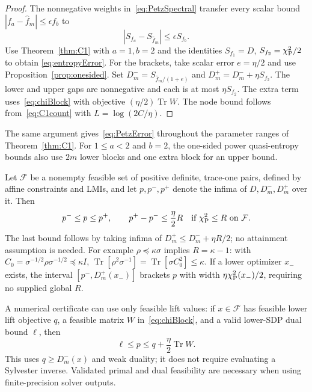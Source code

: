 \documentclass[11pt]{article}
\numberwithin{equation}{section}
\newcommand{\tr}{\operatorname{Tr}}
\begin{document}
\begin{proof}
The nonnegative weights in~\eqref{eq:PetzSpectral} transfer every scalar
bound $|f_a-\widehat f_m|\le\epsilon f_b$ to
\begin{equation}\label{eq:PetzError}
 |S_{f_a}-S_{\widehat f_m}|\le\epsilon S_{f_b}.
\end{equation}
Use Theorem~\ref{thm:C1} with $a=1,b=2$ and the identities
$S_{f_1}=D$, $S_{f_2}=\chi_{\rm P}^2/2$ to obtain
\eqref{eq:entropyError}. For the brackets, take scalar error
$e=\eta/2$ and use Proposition~\ref{prop:onesided}. Set
$D_m^-=S_{\widehat f_m/(1+e)}$ and
$D_m^+=D_m^-+\eta S_{f_2}$. The lower and upper gaps are nonnegative
and each is at most $\eta S_{f_2}$.
The extra term uses~\eqref{eq:chiBlock} with objective
$(\eta/2)\tr W$. The node bound follows from~\eqref{eq:C1count} with
$L=\log(2C/\eta)$.
\end{proof}

The same argument gives~\eqref{eq:PetzError} throughout the parameter
ranges of Theorem~\ref{thm:C1}. For $1\le a<2$ and $b=2$, the
one-sided power quasi-entropy bounds also use $2m$ lower blocks and
one extra block for an upper bound.

Let $\mathcal F$ be a nonempty feasible set of positive definite,
trace-one pairs, defined by affine constraints and LMIs, and let
$p,p^-,p^+$ denote the infima of $D,D_m^-,D_m^+$ over it. Then
\begin{equation}\label{eq:optimizationBracket}
 p^-\le p\le p^+,
 \qquad p^+-p^-\le\frac\eta2R
 \quad\text{if }\chi_{\rm P}^2\le R\text{ on }\mathcal F.
\end{equation}
The last bound follows by taking infima of
$D_m^+\le D_m^-+\eta R/2$; no attainment assumption is needed.
For example $\rho\preceq\kappa\sigma$ implies $R=\kappa-1$:
with $C_0=\sigma^{-1/2}\rho\sigma^{-1/2}\preceq\kappa I$,
$\tr[\rho^2\sigma^{-1}]=\tr[\sigma C_0^2]\le\kappa$.
If a lower optimizer $x_-$ exists, the interval
$[p^-,D_m^+(x_-)]$ brackets $p$ with width
$\eta\chi_{\rm P}^2(x_-)/2$, requiring no supplied global $R$.

A numerical certificate can use only feasible lift values: if
$x\in\mathcal F$ has feasible lower lift objective $q$, a feasible
matrix $W$ in~\eqref{eq:chiBlock}, and a valid lower-SDP dual bound
$\ell$, then
\begin{equation}\label{eq:primalDualBracket}
 \ell\le p\le q+\frac\eta2\tr W.
\end{equation}
This uses $q\ge D_m^-(x)$ and weak duality; it does not require
evaluating a Sylvester inverse. Validated primal and dual feasibility
are necessary when using finite-precision solver outputs.
\end{document}
